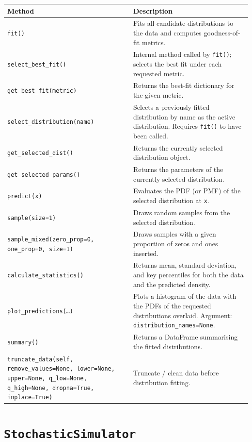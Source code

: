 \begin{longtable}{p{}p{}}
\toprule
\textbf{Method} & \textbf{Description} \\
\midrule
\endhead
\texttt{fit()} &
    Fits all candidate distributions to the data and computes
    goodness-of-fit metrics. \\
\texttt{select\_best\_fit()} &
    Internal method called by \texttt{fit()}; selects the best fit under
    each requested metric. \\
\texttt{get\_best\_fit(metric)} &
    Returns the best-fit dictionary for the given metric. \\
\texttt{select\_distribution(name)} &
    Selects a previously fitted distribution by name as the active
    distribution. Requires \texttt{fit()} to have been called. \\
\texttt{get\_selected\_dist()} &
    Returns the currently selected distribution object. \\
\texttt{get\_selected\_params()} &
    Returns the parameters of the currently selected distribution. \\
\texttt{predict(x)} &
    Evaluates the PDF (or PMF) of the selected distribution at \texttt{x}. \\
\texttt{sample(size=1)} &
    Draws random samples from the selected distribution. \\
\texttt{sample\_mixed(zero\_prop=0, one\_prop=0, size=1)} &
    Draws samples with a given proportion of zeros and ones inserted. \\
\texttt{calculate\_statistics()} &
    Returns mean, standard deviation, and key percentiles for both the
    data and the predicted density. \\
\texttt{plot\_predictions(\dots)} &
    Plots a histogram of the data with the PDFs of the requested
    distributions overlaid. Argument:
    \texttt{distribution\_names=None}. \\
\texttt{summary()} &
    Returns a DataFrame summarising the fitted distributions. \\
\texttt{truncate\_data(self, remove\_values=None, lower=None, upper=None, q\_low=None, q\_high=None, dropna=True, inplace=True)} &
    Truncate / clean data before distribution fitting. \\
\bottomrule
\end{longtable}

\section{\texttt{StochasticSimulator}}
\label{api:stochastic_simulator}

